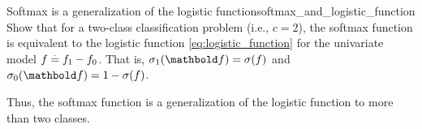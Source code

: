 \excheading

\begin{nexercise}{Softmax is a generalization of the logistic function}{softmax_and_logistic_function}
  Show that for a two-class classification problem (i.e., $c = 2$), the softmax function is equivalent to the logistic function \eqref{eq:logistic_function} for the univariate model $f \overset{.}{=} f_1 - f_0$.
  That is, $\sigma_1(\vf) = \sigma(f)$ and $\sigma_0(\vf) = 1 - \sigma(f)$.

  Thus, the softmax function is a generalization of the logistic function to more than two classes.
\end{nexercise}
